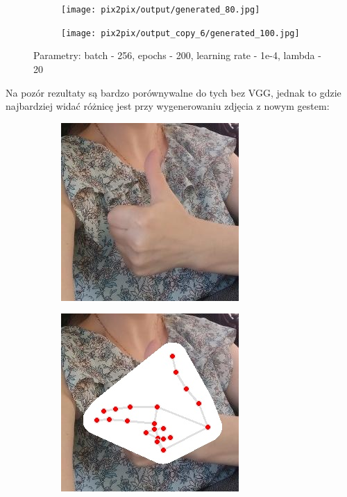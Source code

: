 \documentclass[12pt]{article}
\begin{document}
\begin{sloppypar}
{{\begin{figure}[H]
\begin{subfigure}{.5\textwidth}
        \texttt{[image: pix2pix/output/generated\_80.jpg]}
      \end{subfigure}
      \begin{subfigure}{.5\textwidth}
        \centering
        \texttt{[image: pix2pix/output\_copy\_6/generated\_100.jpg]}
      \end{subfigure}
      \caption{Parametry: batch - 256, epochs - 200, learning rate - 1e-4, lambda - 20}
    \end{figure}
    Na pozór rezultaty są bardzo porównywalne do tych bez VGG, jednak to gdzie najbardziej widać różnicę jest przy wygenerowaniu zdjęcia z nowym gestem:
    \begin{figure}[H]
      \begin{subfigure}{.32\textwidth}
        \centering
        \includegraphics[width=.8\linewidth]{pix2pix/source.jpg}
      \end{subfigure}
      \begin{subfigure}{.32\textwidth}
        \centering
        \includegraphics[width=.8\linewidth]{pix2pix/replace.jpg}

\end{subfigure}
\end{figure}}}
\end{sloppypar}
\end{document}
